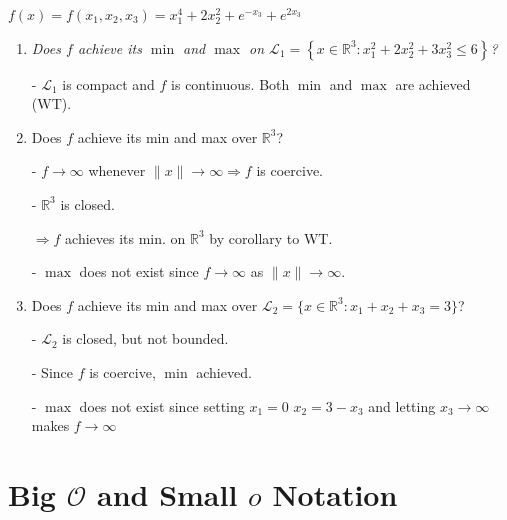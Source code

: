 \documentclass[11pt]{elegantbook}
\begin{document}
\begin{example}
    $f(x)=f\left(x_{1}, x_{2}, x_{3}\right)=x_{1}^{4}+2 x_{2}^{2}+e^{-x_{3}}+e^{2 x_{3}}$
\end{example}

\begin{enumerate}[1)]
    \item \textit{Does $f$ achieve its $\min$ and $\max$ on $\mathcal{L}_{1}=\left\{x \in \mathbb{R}^{3}: x_{1}^{2}+2 x_{2}^{2}+3 x_{3}^{2} \leqslant 6\right\}$?}
    
    - $\mathcal{L}_{1}$ is compact and $f$ is continuous. Both $\min$ and $\max$ are achieved (WT).
    \item Does $f$ achieve its min and max over $\mathbb{R}^{3}$?
    
    - $f \rightarrow \infty$ whenever $\|x\| \rightarrow \infty \Rightarrow f$ is coercive.

    - $\mathbb{R}^{3}$ is closed.

    $\Rightarrow f$ achieves its min. on $\mathbb{R}^{3}$ by corollary to WT.

    - $\max$ does not exist since $f \rightarrow \infty$ as $\|x\| \rightarrow \infty$.

    \item Does $f$ achieve its min and max over $\mathcal{L}_{2}=\{x \in \mathbb{R}^{3}: x_{1}+x_{2}+x_{3}=3\}$?
    
    - $\mathcal{L}_{2}$ is closed, but not bounded.

    - Since $f$ is coercive, $\min$ achieved.

    - $\max$ does not exist since setting $x_{1}=0$ $x_{2}=3-x_{3}$ and letting $x_{3} \rightarrow \infty$ makes $f \rightarrow \infty$
\end{enumerate}








\chapter{Big $\mathcal{O}$ and Small $o$ Notation}
\end{document}
